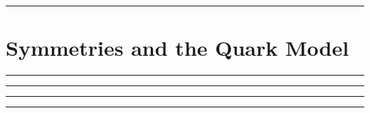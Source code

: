 
\noindent\rule{7in}{2.8pt}
\section{Symmetries and the Quark Model}
    
\begin{problem}{9.0}

\end{problem}

\begin{solution}


\end{solution}

\noindent\rule{7in}{1.5pt}


\begin{problem}{9.1}

\end{problem}

\begin{solution}


\end{solution}

\noindent\rule{7in}{1.5pt}


\begin{problem}{9.2}

\end{problem}

\begin{solution}


\end{solution}

\noindent\rule{7in}{1.5pt}


\begin{problem}{9.3}

\end{problem}

\begin{solution}


\end{solution}

\noindent\rule{7in}{1.5pt}


